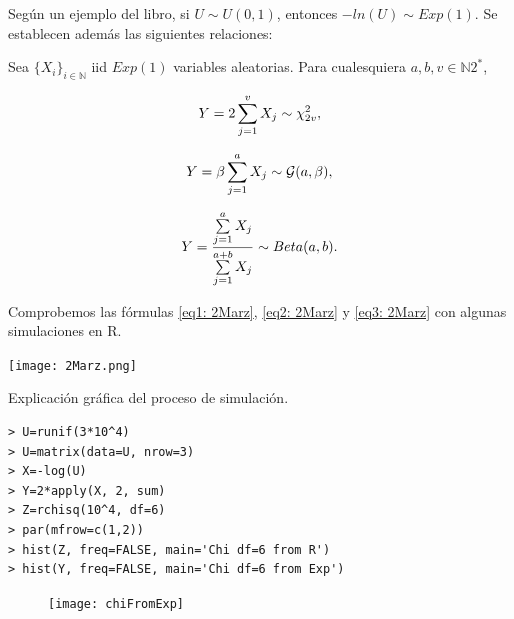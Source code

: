 Según un ejemplo del libro, si $U \sim U(0,1)$, entonces
$-ln(U) \sim Exp(1)$. Se establecen además las siguientes
relaciones:

\begin{teo}
Sea $\{ X_{i} \}_{i \in \mathbb{N}}$ iid $Exp(1)$ variables aleatorias.
Para cualesquiera $a, b, v \in \mathbb{N}2^{*}$, 

\begin{equation}
\label{eq1: 2Marz}
Y=2 \sum\limits_{j=1}^{v}X_{j} \sim \chi_{2v}^{2},
\end{equation}

\begin{equation}
\label{eq2: 2Marz}
Y=\beta \sum\limits_{j=1}^{a}X_{j} \sim \mathcal{G}(a, \beta),
\end{equation}

\begin{equation}
\label{eq3: 2Marz}
Y= \frac{\sum\limits_{j=1}^{a}X_{j}}{\sum\limits_{j=1}^{a+b}X_{j}} 
\sim Beta(a,b).
\end{equation}
\end{teo}

Comprobemos las fórmulas \eqref{eq1: 2Marz}, \eqref{eq2: 2Marz}
y \eqref{eq3: 2Marz} con algunas simulaciones en R.

\begin{center}
\begin{marginfigure}
  \centering
  \texttt{[image: 2Marz.png]}
  \caption{Explicación gráfica del proceso de simulación.}
\end{marginfigure}
\end{center}

\begin{verbatim}
> U=runif(3*10^4)
> U=matrix(data=U, nrow=3)
> X=-log(U)
> Y=2*apply(X, 2, sum)
> Z=rchisq(10^4, df=6)
> par(mfrow=c(1,2))
> hist(Z, freq=FALSE, main='Chi df=6 from R')
> hist(Y, freq=FALSE, main='Chi df=6 from Exp')
\end{verbatim}

\begin{figure}[H]
\centering
	\texttt{[image: chiFromExp]} 
\end{figure}

